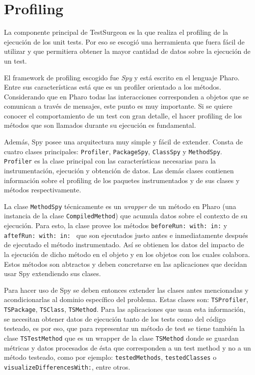 \section{Profiling}
 
\par La componente principal de TestSurgeon es la que realiza el profiling  de la ejecución de los unit tests. Por eso se escogió una herramienta que fuera fácil de utilizar y que permitiera obtener la mayor cantidad de datos sobre la ejecución de un test.
\par El framework de profiling escogido fue \emph{Spy} y está escrito en el lenguaje Pharo. Entre sus características está que es un profiler orientado a los métodos. Considerando que en Pharo todas las interacciones corresponden a objetos que se comunican a través de mensajes, este punto es muy importante. Si se quiere conocer el comportamiento de un test con gran detalle, el hacer profiling de los métodos que son llamados durante su ejecución es fundamental. 

\par Además, Spy posee una arquitectura muy simple y fácil de extender. Consta de cuatro clases principales: {\tt Profiler}, {\tt PackageSpy}, {\tt ClassSpy} y {\tt MethodSpy}. {\tt Profiler} es la clase principal con las características necesarias para la instrumentación, ejecución y obtención de datos. Las demás clases contienen información sobre el profiling de los paquetes instrumentados y de sus clases y métodos respectivamente. 

\par La clase {\tt MethodSpy} técnicamente es un \emph{wrapper} de un método en Pharo (una instancia de la clase {\tt CompiledMethod}) que acumula datos sobre el contexto de su ejecución. Para esto, la clase provee los métodos {\tt beforeRun: with: in:} y {\tt aftefRun: with: in: } que son ejecutados justo antes e inmediatamente después de ejecutado el método instrumentado. Así se obtienen los datos del impacto de la ejecución de dicho método en el objeto y en los objetos con los cuales colabora. Estos métodos son abtractos y deben concretarse en las aplicaciones que decidan usar Spy extendiendo sus clases. 



\par Para hacer uso de Spy se deben entonces extender las clases antes mencionadas y acondicionarlas al dominio específico del problema. Estas clases son: {\tt TSProfiler}, {\tt TSPackage}, {\tt TSClass}, {\tt TSMethod}. Para las aplicaciones que usan esta información, se necesitan obtener datos de ejecución tanto de los tests como del código testeado, es por eso, que para representar un método de test se tiene también la clase {\tt TSTestMethod} que es un wrapper de la clase {\tt TSMethod} donde se guardan métricas y datos procesados de ésta que corresponden a un test method y no a un método testeado, como por ejemplo: {\tt testedMethods}, {\tt testedClasses} o {\tt visualizeDifferencesWith:}, entre otros.

